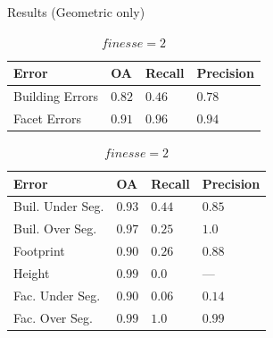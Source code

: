 \documentclass{beamer}
\begin{document}
        \begin{frame}[plain]{Results (Geometric only)}
            \begin{table}
                \begin{subtable}{.4\textwidth}
                    \tiny
                    \begin{center}
                        \begin{tabular}{x{1cm} x{.5cm} x{.5cm} x{.5cm}}
                            \toprule
                            {\bf Error} & {\bf OA} & {\bf Recall} & {\bf Precision} \\
                            \midrule
                            Building Errors & $0.82$ & $0.46$ & $0.78$ \\
                            \midrule
                            Facet Errors & $0.91$ & $0.96$ & $0.94$ \\
                            \bottomrule
                        \end{tabular}
                        \caption{\tiny\label{tab::finesse2} $finesse = 2$}
                    \end{center}
                \end{subtable}
                \begin{subtable}{.45\textwidth}
                    \tiny
                    \begin{center}
                        \begin{tabular}{x{1.75cm} x{.5cm} x{.5cm} x{.5cm}}
                            \toprule
                            {\bf Error} & {\bf OA} & {\bf Recall} & {\bf Precision} \\
                            \midrule
                            Buil. Under Seg. & $0.93$ & $0.44$ & $0.85$ \\
                            \midrule
                            Buil. Over Seg. & $0.97$ & $0.25$ & $1.0$ \\
                            \midrule
                            Footprint & $0.90$ & $0.26$ & $0.88$ \\
                            \midrule
                            Height & $0.99$ & $0.0$ & --- \\
                            \midrule
                            \midrule
                            Fac. Under Seg. & $0.90$ & $0.06$ & $0.14$ \\
                            \midrule
                            Fac. Over Seg. & $0.99$ & $1.0$ & $0.99$ \\

\end{tabular}
\end{center}
\end{subtable}
\end{table}
\end{frame}
\end{document}

